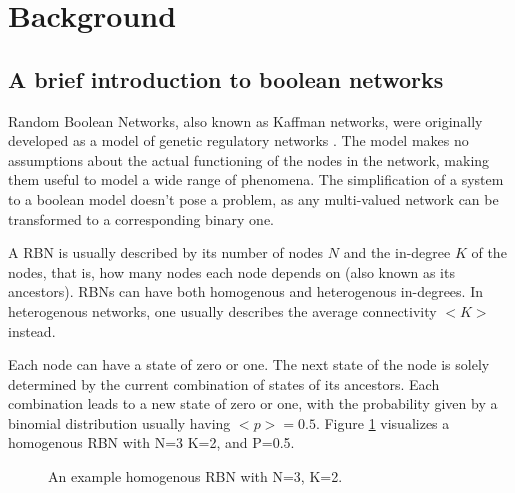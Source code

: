 \section{Background}

\subsection{A brief introduction to boolean networks}

Random Boolean Networks, also known as Kaffman networks, were originally developed as a model of genetic regulatory networks \cite{kauffman1969metabolic}.
The model makes no assumptions about the actual functioning of the nodes in the network,
making them useful to model a wide range of phenomena.
The simplification of a system to a boolean model doesn't pose a problem,
as any multi-valued network can be transformed to a corresponding binary one.

A RBN is usually described by its number of nodes $N$ and the in-degree $K$ of the nodes,
that is, how many nodes each node depends on (also known as its ancestors).
RBNs can have both homogenous and heterogenous in-degrees.
In heterogenous networks, one usually describes the average connectivity $<K>$ instead.

Each node can have a state of zero or one.
The next state of the node is solely determined by the current combination of states of its ancestors.
Each combination leads to a new state of zero or one,
with the probability given by a binomial distribution usually having $<p>=0.5$.
Figure \ref{figure:sample-homogenous-rbn} visualizes a homogenous RBN with N=3 K=2, and P=0.5.

\begin{figure}
  \centering
  \caption{An example homogenous RBN with N=3, K=2.}
  \label{figure:sample-homogenous-rbn}
\end{figure}

